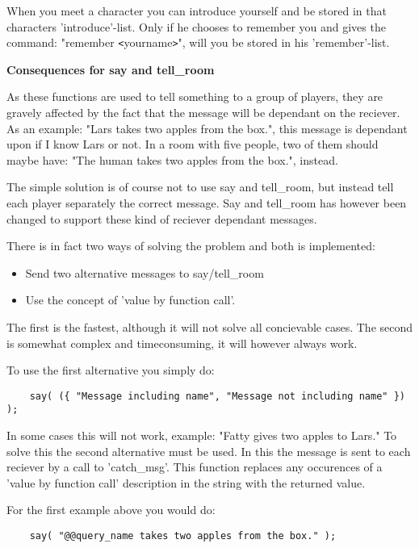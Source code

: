 When you meet a character you can introduce yourself and be stored in that
characters 'introduce'-list. Only if he chooses to remember you and gives the
command: "remember \verb+<+yourname\verb+>+", will you be stored in his 'remember'-list.

{\bf Consequences for say and tell\_room}


As these functions are used to tell something to a group of players, they are
gravely affected by the fact that the message will be dependant on the
reciever. As an example: "Lars takes two apples from the box.", this message
is dependant upon if I know Lars or not. In a room with five people, two of
them should maybe have: "The human takes two apples from the box.", instead.

The simple solution is of course not to use say and tell\_room, but instead tell
each player separately the correct message. Say and tell\_room has however been
changed to support these kind of reciever dependant messages.

There is in fact two ways of solving the problem and both is implemented:

\begin{itemize}
    \item  Send two alternative messages to say/tell\_room
    \item  Use the concept of 'value by function call'.
\end{itemize}

The first is the fastest, although it will not solve all concievable cases.
The second is somewhat complex and timeconsuming, it will however always work.

To use the first alternative you simply do:

\begin{verbatim}
    say( ({ "Message including name", "Message not including name" }) );
\end{verbatim}

In some cases this will not work, example: "Fatty gives two apples to Lars."
To solve this the second alternative must be used. In this the message is sent
to each reciever by a call to 'catch\_msg'. This function replaces any
occurences of a 'value by function call' description in the string with the
returned value.

For the first example above you would do:

\begin{verbatim}
    say( "@@query_name takes two apples from the box." );
\end{verbatim}

